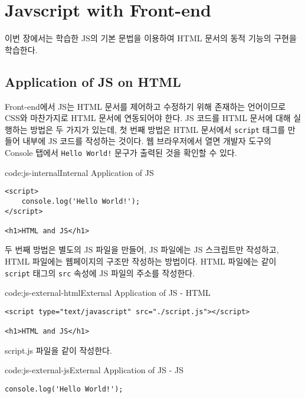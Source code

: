 \section{Javscript with Front-end} \label{sect:javascript-with-front-end}

이번 장에서는  학습한 JS의 기본 문법을 이용하여 HTML 문서의 동적 기능의 구현을 학습한다.

\subsection*{Application of JS on HTML}

Front-end에서 JS는 HTML 문서를 제어하고 수정하기 위해 존재하는 언어이므로 CSS와 마찬가지로 HTML 문서에 연동되어야 한다. JS 코드를 HTML 문서에 대해 실행하는 방법은 두 가지가 있는데, 첫 번째 방법은 HTML 문서에서 \texttt{script} 태그를 만들어 내부에 JS 코드를 작성하는 것이다. \을 웹 브라우저에서 열면 개발자 도구의 Console 탭에서 \texttt{Hello World!} 문구가 출력된 것을 확인할 수 있다.

\begin{codeenv}{code:js-internal}{Internal Application of JS}\begin{verbatim}
<script>
    console.log('Hello World!');
</script>

<h1>HTML and JS</h1>
\end{verbatim}
\end{codeenv}

두 번째 방법은 별도의 JS 파일을 만들어, JS 파일에는 JS 스크립트만 작성하고, HTML 파일에는 웹페이지의 구조만 작성하는 방법이다. HTML 파일에는 \과 같이 \texttt{script} 태그의 \texttt{src} 속성에 JS 파일의 주소를 작성한다.

\begin{codeenv}{code:js-external-html}{External Application of JS - HTML}\begin{verbatim}
<script type="text/javascript" src="./script.js"></script>

<h1>HTML and JS</h1>
\end{verbatim}
\end{codeenv}

script.js 파일을 \와 같이 작성한다.

\begin{codeenv}{code:js-external-js}{External Application of JS - JS}\begin{verbatim}
console.log('Hello World!');
\end{verbatim}
\end{codeenv}

